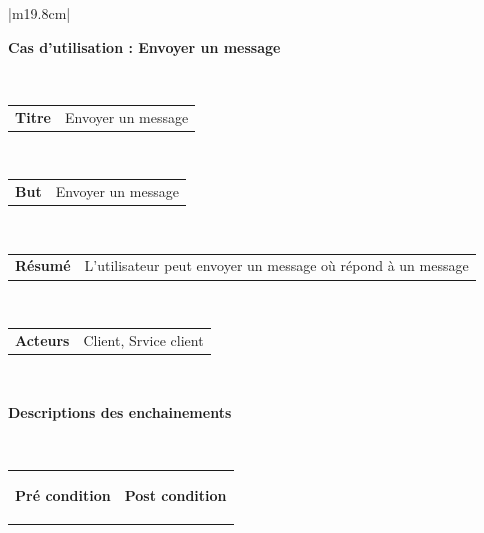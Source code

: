\begin{table}[h]
	\hspace*{-2cm}
	\vspace*{-2cm}
	\begin{tabular}{|m{19.8cm}|}
		\hline
		\begin{center}
			\textbf{Cas d’utilisation : Envoyer un message}
		\end{center}
		\\
		[-4ex] 
		\hline
		\begin{tabular}{m{3cm}|m{14cm}}
			
			\centering 	\textbf{Titre} & Envoyer un message
			\\
			[0ex] 
		\end{tabular}
		\\
		
		\hline
		\begin{tabular}{m{3cm}|m{14cm}}
			
			\centering 	\textbf{But} & Envoyer un message\\
			[0ex] 
			
		\end{tabular}
		\\
		\hline
		\begin{tabular}{m{3cm}|m{15.5cm}}
			
			\centering 	\textbf{Résumé} &L'utilisateur peut envoyer un message où répond à un message
			\\
			[0ex] 
		\end{tabular}
		\\
		
		\hline
		\begin{tabular}{m{3cm}|m{14cm}}
			
			\centering 	\textbf{Acteurs } & Client, Srvice client \\[0ex]
			
		\end{tabular}
		\\
		
		\hline
		\begin{center}
			\textbf{Descriptions des enchainements}
		\end{center}
		\\
		[-4ex] 
		\hline	
		\begin{tabular}{m{9.3cm}|m{9.3cm}}
			
			\begin{center}
				\textbf{Pré condition}
			\end{center}
			& 
			\begin{center}
				\textbf{Post condition}
			\end{center}
			\\[-4ex]
		\end{tabular}
		\\
		

\end{tabular}
\end{table}
